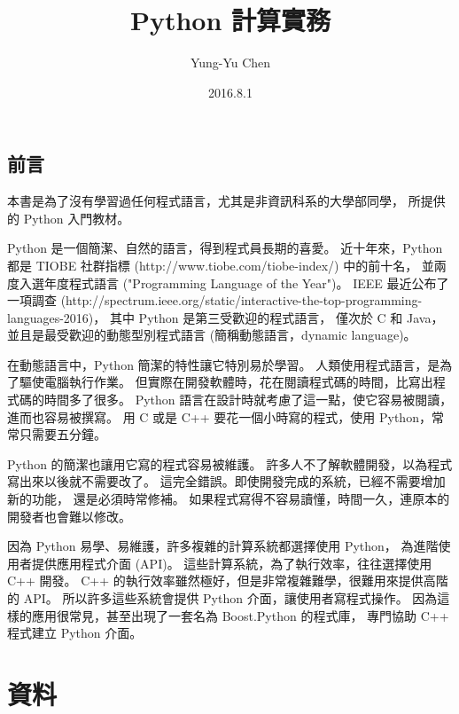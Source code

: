 \documentclass[a4paper,12pt]{book}
\begin{document}
\title{Python 計算實務}
\author{Yung-Yu Chen}
\date{2016.8.1}

\maketitle

\tableofcontents

\hspace{.5cm}

\frontmatter

\chapter*{前言}

本書是為了沒有學習過任何程式語言，尤其是非資訊科系的大學部同學，
所提供的 Python 入門教材。

Python 是一個簡潔、自然的語言，得到程式員長期的喜愛。
近十年來，Python 都是 TIOBE 社群指標
(http://www.tiobe.com/tiobe-index/) 中的前十名，
並兩度入選年度程式語言 ("Programming Language of the Year")。
IEEE 最近公布了一項調查 (http://spectrum.ieee.org/static/interactive-the-top-programming-languages-2016)，
其中 Python 是第三受歡迎的程式語言，
僅次於 C 和 Java，並且是最受歡迎的動態型別程式語言
(簡稱動態語言，dynamic language)。

在動態語言中，Python 簡潔的特性讓它特別易於學習。
人類使用程式語言，是為了驅使電腦執行作業。
但實際在開發軟體時，花在閱讀程式碼的時間，比寫出程式碼的時間多了很多。
Python 語言在設計時就考慮了這一點，使它容易被閱讀，進而也容易被撰寫。
用 C 或是 C++ 要花一個小時寫的程式，使用 Python，常常只需要五分鐘。

Python 的簡潔也讓用它寫的程式容易被維護。
許多人不了解軟體開發，以為程式寫出來以後就不需要改了。
這完全錯誤。即使開發完成的系統，已經不需要增加新的功能，
還是必須時常修補。
如果程式寫得不容易讀懂，時間一久，連原本的開發者也會難以修改。

因為 Python 易學、易維護，許多複雜的計算系統都選擇使用 Python，
為進階使用者提供應用程式介面 (API)。
這些計算系統，為了執行效率，往往選擇使用 C++ 開發。
C++ 的執行效率雖然極好，但是非常複雜難學，很難用來提供高階的 API。
所以許多這些系統會提供 Python 介面，讓使用者寫程式操作。
因為這樣的應用很常見，甚至出現了一套名為 Boost.Python 的程式庫，
專門協助 C++ 程式建立 Python 介面。

\mainmatter

\part{資料}
\end{document}
